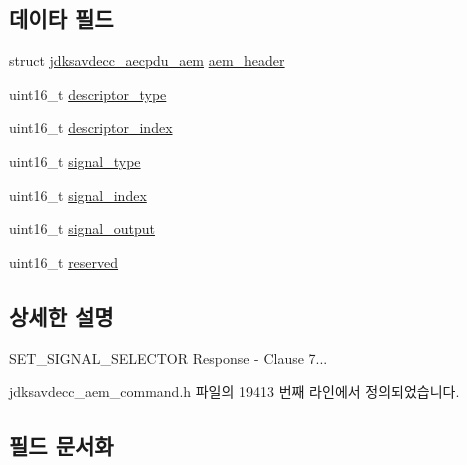 \subsection*{데이타 필드}
\begin{DoxyCompactItemize}
\item 
struct \hyperlink{structjdksavdecc__aecpdu__aem}{jdksavdecc\+\_\+aecpdu\+\_\+aem} \hyperlink{structjdksavdecc__aem__command__set__signal__selector__response_ae1e77ccb75ff5021ad923221eab38294}{aem\+\_\+header}
\item 
uint16\+\_\+t \hyperlink{structjdksavdecc__aem__command__set__signal__selector__response_ab7c32b6c7131c13d4ea3b7ee2f09b78d}{descriptor\+\_\+type}
\item 
uint16\+\_\+t \hyperlink{structjdksavdecc__aem__command__set__signal__selector__response_a042bbc76d835b82d27c1932431ee38d4}{descriptor\+\_\+index}
\item 
uint16\+\_\+t \hyperlink{structjdksavdecc__aem__command__set__signal__selector__response_a248e60ef99d5ed1779989d1dd6b6dc5a}{signal\+\_\+type}
\item 
uint16\+\_\+t \hyperlink{structjdksavdecc__aem__command__set__signal__selector__response_ae2e81a95ee9ad83f1fe22b6a1ee29075}{signal\+\_\+index}
\item 
uint16\+\_\+t \hyperlink{structjdksavdecc__aem__command__set__signal__selector__response_ab4b91864e6fc335d7e86536d9f4461e4}{signal\+\_\+output}
\item 
uint16\+\_\+t \hyperlink{structjdksavdecc__aem__command__set__signal__selector__response_a5a6ed8c04a3db86066924b1a1bf4dad3}{reserved}
\end{DoxyCompactItemize}


\subsection{상세한 설명}
S\+E\+T\+\_\+\+S\+I\+G\+N\+A\+L\+\_\+\+S\+E\+L\+E\+C\+T\+OR Response -\/ Clause 7... 

jdksavdecc\+\_\+aem\+\_\+command.\+h 파일의 19413 번째 라인에서 정의되었습니다.



\subsection{필드 문서화}
